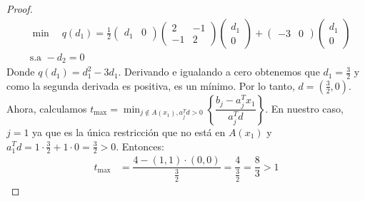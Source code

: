 \documentclass{article}
\begin{document}
\begin{proof}
\begin{align*}
         & \min \quad q(d_1) = \frac{1}{2} \begin{pmatrix}
                                               d_1 & 0
                                           \end{pmatrix} \begin{pmatrix}
                                                             2  & -1 \\
                                                             -1 & 2
                                                         \end{pmatrix} \begin{pmatrix}
                                                                           d_1 \\
                                                                           0
                                                                       \end{pmatrix} + \begin{pmatrix}
                                                                                           -3 & 0
                                                                                       \end{pmatrix} \begin{pmatrix}
                                                                                                         d_1 \\
                                                                                                         0
                                                                                                     \end{pmatrix} \\
         & \text{s.a } -d_2 = 0
    \end{align*}
    Donde \( q(d_1) = d_1^2 - 3d_1 \). Derivando e igualando a cero obtenemos que \( d_1 = \frac{3}{2} \) y como la segunda derivada es positiva, es un mínimo. Por lo tanto, \( d = \left( \frac{3}{2}, 0 \right) \). Ahora, calculamos \( t_{\max} = \min_{j \notin A(x_1), a_j^T d > 0} \left \{ \dfrac{b_j - a_j^T x_1}{a_j^T d} \right \} \). En nuestro caso, \( j = 1 \) ya que es la única restricción que no está en \( A(x_1) \) y \( a_1^T d = 1 \cdot \frac{3}{2} + 1 \cdot 0 = \frac{3}{2} > 0 \). Entonces: \begin{align*}
        t_{\max} & = \dfrac{4 - (1, 1) \cdot (0, 0)}{\frac{3}{2}} = \dfrac{4}{\frac{3}{2}} = \dfrac{8}{3} > 1
    \end{align*}

\end{proof}
\end{document}
